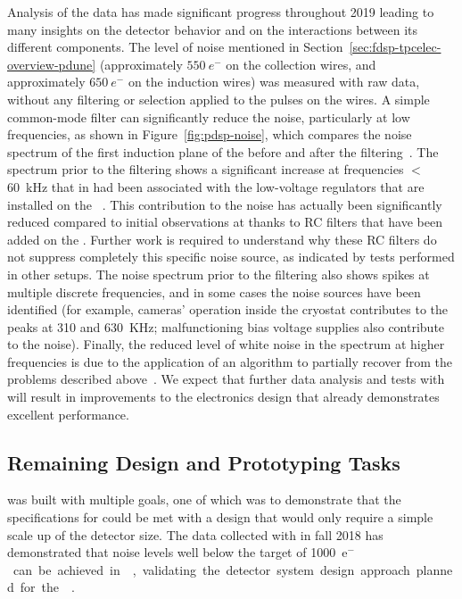 Analysis of the  data has made significant progress throughout 2019 
leading to many insights on the detector behavior and on the interactions
between its different components. The level of noise mentioned in Section~\ref{sec:fdsp-tpcelec-overview-pdune}
(approximately $\SI{550}{e^-}$ on the collection wires,
and approximately $\SI{650}{e^-}$ on the induction wires) 
was measured with raw data, without any
filtering or selection applied to the pulses on the 
wires. A simple common-mode filter can significantly reduce the 
noise, particularly at low frequencies, as shown in Figure~\ref{fig:pdsp-noise},  
which compares the noise spectrum of the first induction plane of the 
before and after the filtering~\cite{pend_PDSP_PerfPaper}. The spectrum prior to the
filtering shows a significant increase at frequencies $<$\SI{60}{kHz} that in
 had been associated with the low-voltage regulators that are installed
on the ~\cite{Acciarri:2017sde}. This contribution to the noise
has actually been significantly reduced compared to initial observations at 
 thanks to RC filters that have been added
on the  . Further work is required to
understand why these RC filters do not suppress completely this
specific noise source, as indicated by tests performed in other setups.
The noise spectrum prior to the filtering also shows spikes at multiple 
discrete frequencies, and in some cases the noise sources have been 
identified (for example, cameras' operation inside the cryostat
contributes to the peaks at \num{310} and \SI{630}{KHz};
malfunctioning bias voltage supplies also contribute to the noise). Finally,
the reduced level of white noise in the spectrum at higher frequencies is
due to the application of an algorithm to partially recover from the 
problems described above~\cite{pend_PDSP_PerfPaper}. We
expect that further data analysis and tests with 
will result in improvements to the  electronics design that
already demonstrates excellent performance.

\subsection{Remaining Design and Prototyping Tasks}
\label{sec:fdsp-tpcelec-overview-remaining}

  was %
 built with multiple
goals, one of which was to demonstrate that the specifications
for  could be met with a design that would only require a simple
scale up of the detector size. The data collected with 
in fall 2018 has demonstrated that noise levels well below the target
of \SI{1000}{e$^-$} can be achieved in \lar, validating the
detector system design approach planned for the  .

